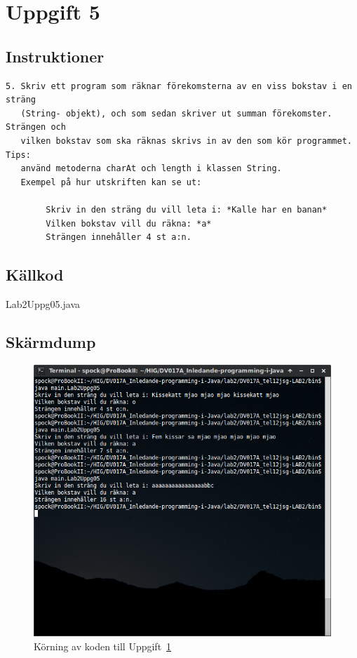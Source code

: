 \section{Uppgift 5}\label{sec:uppg05}

\subsection{Instruktioner}
\begin{verbatim}
5. Skriv ett program som räknar förekomsterna av en viss bokstav i en sträng
   (String- objekt), och som sedan skriver ut summan förekomster. Strängen och
   vilken bokstav som ska räknas skrivs in av den som kör programmet. Tips:
   använd metoderna charAt och length i klassen String.
   Exempel på hur utskriften kan se ut:

        Skriv in den sträng du vill leta i: *Kalle har en banan*
        Vilken bokstav vill du räkna: *a*
        Strängen innehåller 4 st a:n.
\end{verbatim}


\subsection{Källkod}
\caption{Lab2Uppg05.java}
\label{src:uppg05}


\subsection{Skärmdump}
\begin{figure}[htbp]
    \centering
        \includegraphics[width=\linewidth]{img/05.png}
    \caption{Körning av koden till Uppgift~\ref{sec:uppg05}}
    \label{fig:uppg05-screenshot}
\end{figure}

